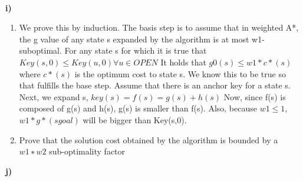 \documentclass[11pt]{article}
\begin{document}
\\
\textbf{i)} \begin{enumerate}
\item We prove this by induction. The basis step is to assume that in weighted A*, the g value of any state s expanded by the algorithm is at most w1-suboptimal. For any state s for which it is true that$ Key(s,0) \leq Key(u,0) \forall u \in OPEN$ It holds that $g0(s) \leq w1 * c * (s)$ where $c*(s)$ is the optimum cost to state s. We know this to be true so that fulfills the base step. Assume that there is an anchor key for a state s. Next, we expand s, $key(s) = f(s) = g(s) + h(s)$ Now, since f(s) is composed of g(s) and h(s), g(s) is smaller than f(s). Also, because $w1 \leq 1 $, $w1 * g*(sgoal)$ will be bigger than Key(s,0).
\item Prove that the solution cost obtained by
the algorithm is bounded by a $w1 ∗ w2$ sub-optimality factor 
\end{enumerate}
\textbf{j)}
\\ 
 
\end{document}
